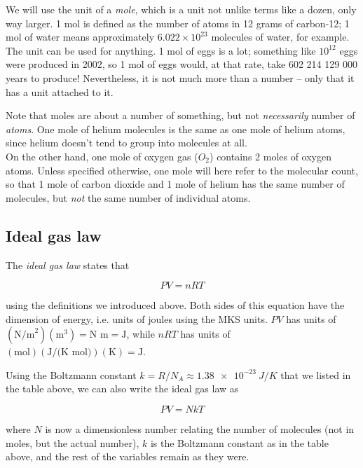 We will use the unit of a \emph{mole}, which is a unit not unlike terms like a dozen, only way larger. 1 mol is defined as the number of atoms in 12 grams of carbon-12; 1 mol of water means approximately $6.022 \times 10^{23}$ molecules of water, for example. The unit can be used for anything. 1 mol of eggs is a lot; something like $10^{12}$ eggs were produced in 2002, so 1 mol of eggs would, at that rate, take 602 214 129 000 years to produce! Nevertheless, it is not much more than a number -- only that it has a unit attached to it.

Note that moles are about a number of something, but not \emph{necessarily} number of \emph{atoms}. One mole of helium molecules is the same as one mole of helium atoms, since helium doesn't tend to group into molecules at all.\\
On the other hand, one mole of oxygen gas ($O_2$) contains 2 moles of oxygen atoms. Unless specified otherwise, one mole will here refer to the molecular count, so that 1 mole of carbon dioxide and 1 mole of helium has the same number of molecules, but \emph{not} the same number of individual atoms.

\subsection{Ideal gas law}

The \emph{ideal gas law} states that

\begin{equation}
P V = n R T
\end{equation}

using the definitions we introduced above. Both sides of this equation have the dimension of energy, i.e. units of joules using the MKS units. $P V$ has units of $(\text{N/m}^2)(\text{m}^3) = \text{N m} = \text{J}$, while $n R T$ has units of $(\text{mol})(\text{J/(K mol)})(\text{K}) = \text{J}$.

Using the Boltzmann constant $k = R/N_A \approx \SI{1.38e-23}{J/K}$ that we listed in the table above, we can also write the ideal gas law as

\begin{equation}
P V = N k T
\end{equation}

where $N$ is now a dimensionless number relating the number of molecules (not in moles, but the actual number), $k$ is the Boltzmann constant as in the table above, and the rest of the variables remain as they were.

